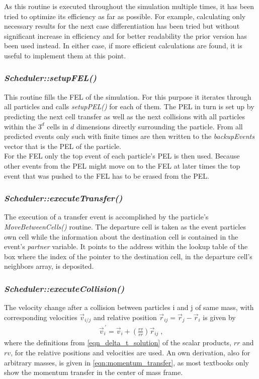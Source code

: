 As this routine is executed throughout the simulation multiple times, it has been tried to optimize its efficiency as far as possible. For example, calculating only necessary results for the next case differentiation has been tried but without significant increase in efficiency and for better readability the prior version has been used instead. In either case, if more efficient calculations are found, it is useful to implement them at this point. 

\subsubsection{\quad \textit{Scheduler::setupFEL()}}
This routine fills the FEL of the simulation. For this purpose it iterates through all particles and calls \textit{setupPEL()} for each of them. The PEL in turn is set up by predicting the next cell transfer as well as the next collisions with all particles within the $3^d$ cells in $d$ dimensions directly surrounding the particle. From all predicted events only such with finite times are then written to the \textit{backupEvents} vector that is the PEL of the particle.\\
For the FEL only the top event of each particle's PEL is then used. Because other events from the PEL might move on to the FEL at later times the top event that was pushed to the FEL has to be erased from the PEL.

\subsubsection{\quad \textit{Scheduler::executeTransfer()}}
The execution of a transfer event is accomplished by the particle's \textit{MoveBetweenCells()} routine. The departure cell is taken as the event particles own cell while the information about the destination cell is contained in the event's \textit{partner} variable. It points to the address within the lookup table of the box where the index of the pointer to the destination cell, in the departure cell's neighbors array, is deposited.

\subsubsection{\quad \textit{Scheduler::executeCollision()}}
The velocity change after a collision between particles i and j of same mass, with corresponding velocities $\vec{v}_{i/j}$ and relative position $\vec{r}_{ij} = \vec{r}_{j} -\vec{r}_{i}$ is given by   
\begin{align}
\label{eqn:collision_result}
\vec{v}_i^{\,'} = \vec{v}_i + \left( \frac{rv}{rr} \right) \vec{r}_{ij} \; \text{,}
\end{align}
where the definitions from \autoref{eqn_delta_t_solution} of the scalar products, $rr$ and $rv$, for the relative positions and velocities are used. An own derivation, also for arbitrary masses, is given in \autoref{eqn:momentum_transfer}, as most textbooks only show the momentum transfer in the center of mass frame.
 
